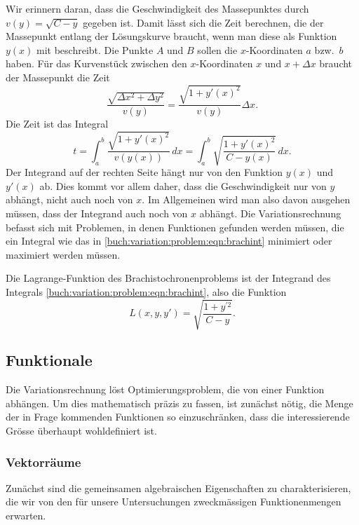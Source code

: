 Wir erinnern daran, dass die Geschwindigkeit des Massepunktes durch
$v(y)=\sqrt{C-y}$ gegeben ist.
Damit lässt sich die Zeit berechnen, die der Massepunkt entlang der
Lösungskurve braucht, wenn man diese als Funktion $y(x)$ mit beschreibt.
Die Punkte $A$ und $B$ sollen die $x$-Koordinaten $a$ bzw.~$b$ haben.
Für das Kurvenstück zwischen den $x$-Koordinaten $x$ und $x+\Delta x$
braucht der Massepunkt die Zeit
\[
\frac{ \sqrt{\Delta x^2 + \Delta y^2} }{v(y)}
=
\frac{ \sqrt{1 + y'(x)^2} }{ v(y) } \Delta x.
\]
Die Zeit ist das Integral
\begin{equation}
t
=
\int_a^b \frac{\sqrt{1+y'(x)^2}}{v(y(x))}\,dx
=
\int_a^b \sqrt{\frac{1+y'(x)^2}{C-y(x)}}\,dx.
\label{buch:variation:problem:eqn:brachint}
\end{equation}
Der Integrand auf der rechten Seite hängt nur von den Funktion $y(x)$
und $y'(x)$ ab.
Dies kommt vor allem daher, dass die Geschwindigkeit nur von $y$ abhängt,
nicht auch noch von $x$.
Im Allgemeinen wird man also davon ausgehen müssen, dass der Integrand
auch noch von $x$ abhängt.
Die Variationsrechnung befasst sich mit Problemen, in denen Funktionen
gefunden werden müssen, die ein Integral wie das in
\eqref{buch:variation:problem:eqn:brachint}
minimiert oder maximiert werden müssen.

\begin{definition}
Die Lagrange-Funk\-tion des Brachistochronenproblems ist der
Integrand des Integrals
\eqref{buch:variation:problem:eqn:brachint},
%
also die Funktion
\[
L(x,y,y')
=
\sqrt{\frac{1+y^{\prime 2}}{C-y}}.
\]
\end{definition}

%
%
\subsection{Funktionale
\label{buch:variation:problem:subsection:funktionale}}
Die Variationsrechnung löst Optimierungsproblem, die von einer
Funktion abhängen.
Um dies mathematisch präzis zu fassen, ist zunächst nötig, die Menge
der in Frage kommenden Funktionen so einzuschränken, dass die interessierende
Grösse überhaupt wohldefiniert ist.

%
%
\subsubsection{Vektorräume}
Zunächst sind die gemeinsamen algebraischen Eigenschaften zu charakterisieren,
die wir von den für unsere Untersuchungen zweckmässigen Funktionenmengen
erwarten.

